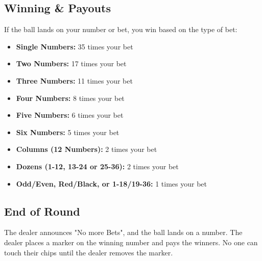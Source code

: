 \documentclass[a4paper]{article}
\begin{document}
\subsection{Winning \& Payouts}
If the ball lands on your number or bet, you win based on the type of bet:
\begin{itemize}
    \item \textbf{Single Numbers:} 35 times your bet
    \item \textbf{Two Numbers:} 17 times your bet
    \item \textbf{Three Numbers:} 11 times your bet
    \item \textbf{Four Numbers:} 8 times your bet
    \item \textbf{Five Numbers:} 6 times your bet 
    \item \textbf{Six Numbers:} 5 times your bet
    \item \textbf{Columns (12 Numbers):} 2 times your bet 
    \item \textbf{Dozens (1-12, 13-24 or 25-36):} 2 times your bet 
    \item \textbf{Odd/Even, Red/Black, or 1-18/19-36:} 1 times your bet 
\end{itemize}

\subsection{End of Round}
The dealer announces "No more Bets", and the ball lands on a number. The dealer places a marker on the winning number
and pays the winners. No one can touch their chips until the dealer removes the marker. 
\end{document}
